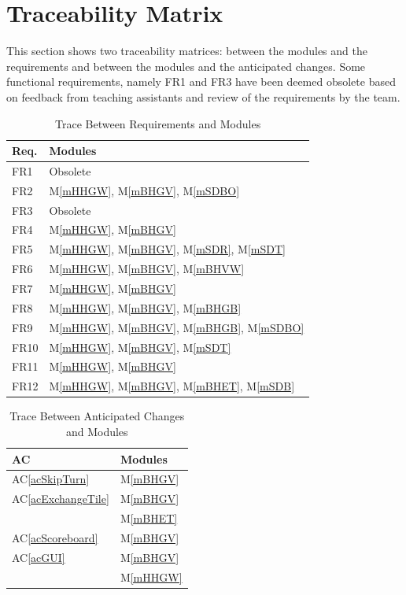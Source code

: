 \documentclass[12pt, titlepage]{article}
\newcommand{\acref}[1]{AC\ref{#1}}
\newcommand{\mref}[1]{M\ref{#1}}
\begin{document}
\section{Traceability Matrix} \label{SecTM} %

This section shows two traceability matrices: between the modules and the
requirements and between the modules and the anticipated changes. Some functional requirements, namely FR1 and FR3 have been deemed obsolete based on feedback from teaching assistants and review of the requirements by the team.
 
\begin{table}[H]
\centering
\begin{tabular}{p{} p{}}
\toprule
\textbf{Req.} & \textbf{Modules}\\
\midrule
FR1 & Obsolete \\
FR2 & \mref{mHHGW}, \mref{mBHGV}, \mref{mSDBO}\\
FR3 & Obsolete \\
FR4 & \mref{mHHGW}, \mref{mBHGV}\\
FR5 & \mref{mHHGW}, \mref{mBHGV}, \mref{mSDR}, \mref{mSDT}\\
FR6 & \mref{mHHGW}, \mref{mBHGV}, \mref{mBHVW}\\
FR7 & \mref{mHHGW}, \mref{mBHGV}\\
FR8 & \mref{mHHGW}, \mref{mBHGV}, \mref{mBHGB}\\
FR9 & \mref{mHHGW}, \mref{mBHGV}, \mref{mBHGB}, \mref{mSDBO}\\
FR10 & \mref{mHHGW}, \mref{mBHGV}, \mref{mSDT}\\
FR11 & \mref{mHHGW}, \mref{mBHGV}\\
FR12 & \mref{mHHGW}, \mref{mBHGV}, \mref{mBHET}, \mref{mSDB}\\
\bottomrule
\end{tabular}
\caption{Trace Between Requirements and Modules}
\label{TblRT}
\end{table}

\begin{table}[H]
\centering
\begin{tabular}{p{} p{}}
\toprule
\textbf{AC} & \textbf{Modules}\\
\midrule
\acref{acSkipTurn} & \mref{mBHGV}\\ %
\acref{acExchangeTile} & \mref{mBHGV}\\
& \mref{mBHET}\\ %
\acref{acScoreboard} & \mref{mBHGV}\\
\acref{acGUI} & \mref{mBHGV}\\
& \mref{mHHGW}\\
\bottomrule
\end{tabular}
\caption{Trace Between Anticipated Changes and Modules}
\label{TblACT}
\end{table}
\end{document}
